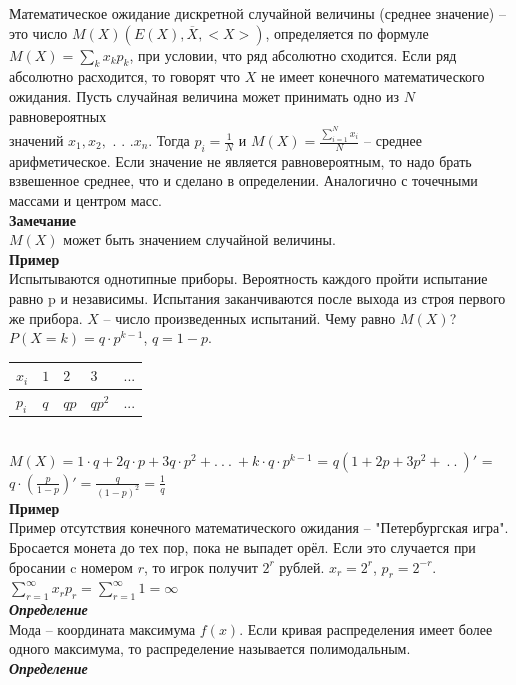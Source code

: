 \documentclass[russian, 12pt, fleqn]{article}
\begin{document}
Математическое ожидание дискретной случайной величины (среднее значение) -- это число $M(X)(E(X), \overline{X} , <X>)$, определяется по формуле $M(X)=\sum\limits_{k}x_kp_k$, при условии, что ряд абсолютно сходится. Если ряд абсолютно расходится, то говорят что $X$ не имеет конечного математического ожидания. Пусть случайная величина может принимать одно из $N$ равновероятных \\ значений $x_1,x_2,$ . . .$x_n$. Тогда $p_i = \frac{1}{N}$ и $M(X) = \frac{\sum\limits_{i = 1}^{N}  x_i } { N }$ -- среднее арифметическое. Если значение не является равновероятным, то надо брать взвешенное среднее, что и сделано в определении. Аналогично с точечными массами и центром масс.\\
\textbf{Замечание\ } \\
$M(X)$ может быть значением случайной величины.\\
\textbf{Пример\ }\\
Испытываются однотипные приборы. Вероятность каждого пройти испытание равно p и независимы. Испытания заканчиваются после выхода из строя первого же прибора. $X$ -- число произведенных испытаний. Чему равно $M(X)$?\\
$P(X=k) = q\cdot p ^{k - 1}$, $q = 1 - p$.\\
\begin{tabular}[b]{ | l | l | l | l | l |   }
\hline
$x_i$&$1$&$2$&$3$&$...$\\
\hline
$p_i$&$q$&$qp$&$qp^2$&...\\
\hline
\end{tabular}\\
$M(X) = 1\cdot q + 2q\cdot p + 3 q \cdot p^2 + .\ .\ .\ +k\cdot q\cdot p^{k-1}$ = $q(1+2p+3p^2 + \ .\ .\ )'$ = $q\cdot(\frac{p}{1-p}) ' = \frac{q}{{(1-p)}^2} = \frac{1}{q}$\\
\textbf{Пример\ }\\
 Пример отсутствия конечного математического ожидания -- "Петербургская игра". Бросается монета до тех пор, пока не выпадет орёл. Если это случается при бросании c номером $r$, то игрок получит $2^r$ рублей. $x_r=2^r$, $p_r=2^{-r}$.\\ $\sum\limits_{r = 1}^{\infty}  x_rp_r = \sum\limits_{r = 1}^{\infty} 1 = \infty$\\
\textit{\textbf{Определение}}\\
Мода -- координата максимума $f(x)$. Если кривая распределения имеет более одного максимума, то распределение называется полимодальным.\\
\textit{\textbf{Определение}}\\
\end{document}
